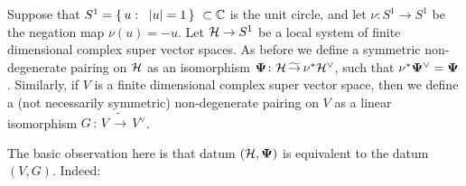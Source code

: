 \documentclass[twoside,leqno]{article}
\numberwithin{equation}{section}
\theoremstyle{plain}
\theoremstyle{definition}
\begin{document}
\medskip


Suppose that $S^1  = \{ \, u \, \colon \, \ |u| = 1 \, \} \ \subset \bbC$ is the unit circle, and let $\nu \colon S^1 \to S^1$ be the negation map $\nu(u) = -u$. Let $\mathcal H \to S^1$ be a local system of finite dimensional complex super vector spaces. As before we define a symmetric non-degenerate pairing on $\mathcal H$ as  an isomorphism
$\boldsymbol{\Psi} \colon \mathcal H \, \widetilde{\to} \, \nu^{*}\mathcal H^{\vee}$, such that $\nu^{*}\boldsymbol{\Psi}^{\vee} = \boldsymbol{\Psi}$.  
Similarly, if  $V$ is a finite dimensional complex super vector space, then we define a (not necessarily symmetric) non-degenerate pairing on $V$ as a linear isomorphism $G \, \colon \, V \, \widetilde{\to} \, V^{\vee}$.

The basic observation here is that  datum $(\mathcal H,\boldsymbol{\Psi})$ is equivalent to the datum $(V,G)$. Indeed:
\end{document}

